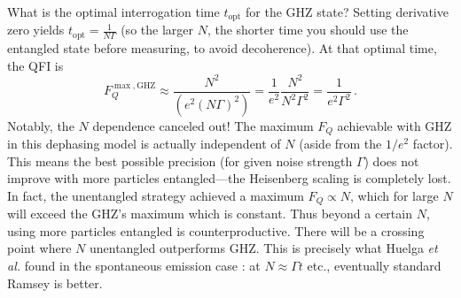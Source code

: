 What is the optimal interrogation time $t_{\text{opt}}$ for the GHZ
state? Setting derivative zero yields $t_{\text{opt}} = \frac{1}{N
  \Gamma}$ (so the larger $N$, the shorter time you should use the
entangled state before measuring, to avoid decoherence). At that
optimal time, the QFI is
\[
F_Q^{\max,\text{GHZ}} \approx \frac{N^2}{(e^2 (N\Gamma)^2)} =
\frac{1}{e^2} \frac{N^2}{N^2 \Gamma^2} = \frac{1}{e^2 \Gamma^2} \,.
\]
Notably, the $N$ dependence canceled out! The maximum $F_Q$ achievable
with GHZ in this dephasing model is actually independent of $N$ (aside
from the $1/e^2$ factor). This means the best possible precision (for
given noise strength $\Gamma$) does not improve with more particles
entangled—the Heisenberg scaling is completely lost. In fact, the
unentangled strategy achieved a maximum $F_Q \propto N$, which for
large $N$ will exceed the GHZ’s maximum which is constant. Thus beyond
a certain $N$, using more particles entangled is
counterproductive. There will be a crossing point where $N$
unentangled outperforms GHZ. This is precisely what Huelga \textit{et
  al.} found in the spontaneous emission case \cite{Huelga1997}: at $N
\approx \Gamma t$ etc., eventually standard Ramsey is better.



